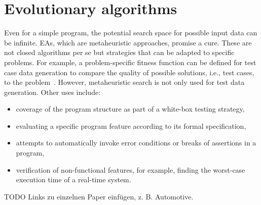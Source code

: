 \documentclass[paper=a4,%
  twoside,%
  BCOR4mm,%
  abstract=true,%
  toc=bibliography,%
  chapterprefix=true,%
  toc=bibliographynumbered,%
  open=right,%
  english,%
  pagesize=pdftex]{scrreprt}
\begin{document}
\section{Evolutionary algorithms}
Even for a simple program, the potential search space for possible input data can be infinite. \acp{EA}, which are metaheuristic approaches, promise a cure. These are not closed algorithms per se but strategies that can be adapted to specific problems. For example, a problem-specific fitness function can be defined for test case data generation to compare the quality of possible solutions, i.e., test cases, to the problem~\cite{McMinn_2004}. However, metaheuristic search is not only used for test data generation. Other uses include:
\begin{itemize}
	\item coverage of the program structure as part of a white-box testing strategy,
	\item evaluating a specific program feature according to its formal specification,
	\item attempts to automatically invoke error conditions or breaks of assertions in a program,
	\item verification of non-functional features, for example, finding the worst-case execution time of a real-time system.
\end{itemize}
TODO Links zu einzelnen Paper einfügen, z. B. Automotive. 

\end{document}
